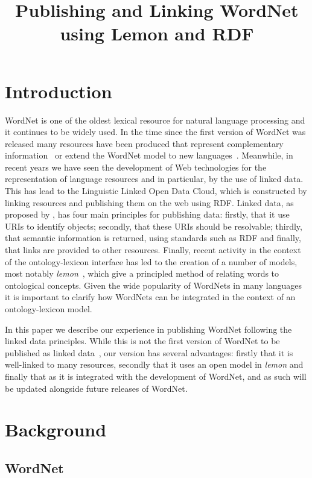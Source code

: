 \documentclass[10pt, a4paper]{article}
\title{Publishing and Linking WordNet using Lemon and RDF}
\newcommand{\lemon}[0]{\emph{lemon}}
\begin{document}
\maketitleabstract

\section{Introduction}

WordNet is one of the oldest lexical resource for natural
language processing and it continues to be widely used. In the time since the first version of WordNet was released many
resources have been produced that represent complementary information~\cite{schuler2005verbnet,baker1998berkeley} or extend
the WordNet model to new languages~\cite{vossen1998eurowordnet,bond2013linking}. 
Meanwhile, in recent years we have seen
the development of Web technologies for the representation of language resources
and in particular, by the use of linked data. This has lead to the Linguistic Linked
Open Data Cloud, which is constructed by linking resources and publishing them
on the web using RDF. Linked data, as proposed by \cite{berners2011linked}, has four
main principles for publishing data: firstly, that it use URIs to identify
objects; secondly, that these URIs should be resolvable; thirdly, that semantic
information is returned, using standards such as RDF and finally, that links are
provided to other resources. 
Finally, recent activity in the context of the ontology-lexicon interface has
led to the creation of a number of models, most notably
\lemon{}~\cite{mccrae2012interchanging}, which give a principled method of
relating words to ontological concepts. Given the wide popularity of WordNets in
many languages it is important to clarify how WordNets can be integrated in
the context of an ontology-lexicon model.


In this paper we describe our experience
in publishing WordNet following the linked data principles. While this is not
the first version of WordNet to be published as linked data~\cite{van2006conversion,mccrae2012integrating,graves2006data}, our 
version has several advantages: firstly that it is well-linked to many
resources, secondly that it uses an open model in \emph{lemon} and finally that as
it is integrated with the development of WordNet, and as such will be updated alongside
future releases of WordNet.

\section{Background}

\subsection{WordNet}
\end{document}
